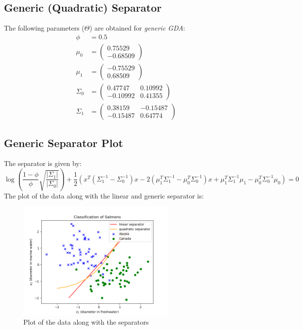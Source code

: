 \documentclass[11pt]{article}
\begin{document}
\subsection{Generic (Quadratic) Separator}
The following parameters ($\Theta$) are obtained for \textit{generic GDA}:
\begin{equation}
    \begin{split}
        \phi &= 0.5\\
        \mu_0 &=
        \begin{pmatrix}
            0.75529\\
            -0.68509
        \end{pmatrix}\\
        \mu_1 &=
        \begin{pmatrix}
            -0.75529\\
            0.68509
        \end{pmatrix}\\
        \Sigma_0 &=
        \begin{pmatrix}
            0.47747 & 0.10992\\
            -0.10992 & 0.41355
        \end{pmatrix}\\
        \Sigma_1 &=
        \begin{pmatrix}
            0.38159 & -0.15487\\
            -0.15487 & 0.64774
        \end{pmatrix}
    \end{split}
\end{equation}

\subsection{Generic Separator Plot}\label{4e}
The separator is given by:
\begin{equation}
    \log\left(\displaystyle\frac{1-\phi}{\phi}\sqrt{\displaystyle\frac{|\Sigma_1|}{|\Sigma_0|}}\right) + \frac{1}{2}\left(x^T(\Sigma_1^{-1}-\Sigma_0^{-1})x - 2(\mu_1^T\Sigma_1^{-1}-\mu_0^T\Sigma_0^{-1})x + \mu_1^T\Sigma_1^{-1}\mu_1 - \mu_0^T\Sigma_0^{-1}\mu_0\right) = 0
\end{equation}
The plot of the data along with the linear and generic separator is:
\begin{figure}[H]
    \centering
    \includegraphics[width=0.7\textwidth]{Q4/output/bce.png}
    \caption{Plot of the data along with the separators}
\end{figure}
\end{document}

